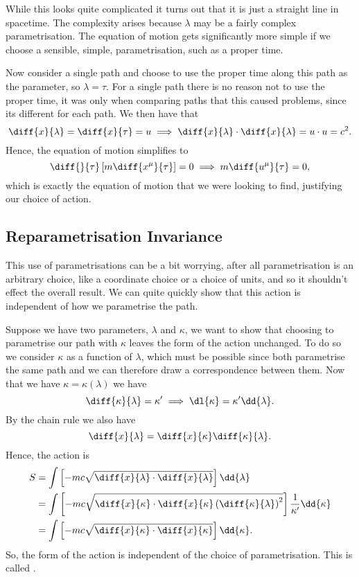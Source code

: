 While this looks quite complicated it turns out that it is just a straight line in spacetime.
The complexity arises because \(\lambda\) may be a fairly complex parametrisation.
The equation of motion gets significantly more simple if we choose a sensible, simple, parametrisation, such as a proper time.

Now consider a single path and choose to use the proper time along this path as the parameter, so \(\lambda = \tau\).
For a single path there is no reason not to use the proper time, it was only when comparing paths that this caused problems, since its different for each path.
We then have that
\begin{equation}
    \diff{x}{\lambda} = \diff{x}{\tau} = u \implies \diff{x}{\lambda}\cdot\diff{x}{\lambda} = u \cdot u = c^2.
\end{equation}
Hence, the equation of motion simplifies to
\begin{equation}
    \diff{}{\tau}\left[ m\diff{x^\mu}{\tau} \right] = 0 \implies m\diff{u^\mu}{\tau} = 0,
\end{equation}
which is exactly the equation of motion that we were looking to find, justifying our choice of action.

\subsection{Reparametrisation Invariance}
This use of parametrisations can be a bit worrying, after all parametrisation is an arbitrary choice, like a coordinate choice or a choice of units, and so it shouldn't effect the overall result.
We can quite quickly show that this action is independent of how we parametrise the path.

Suppose we have two parameters, \(\lambda\) and \(\kappa\), we want to show that choosing to parametrise our path with \(\kappa\) leaves the form of the action unchanged.
To do so we consider \(\kappa\) as a function of \(\lambda\), which must be possible since both parametrise the same path and we can therefore draw a correspondence between them.
Now that we have \(\kappa = \kappa(\lambda)\) we have
\begin{equation}
    \diff{\kappa}{\lambda} = \kappa' \implies \dl{\kappa} = \kappa'\dd{\lambda}.
\end{equation}
By the chain rule we also have
\begin{equation}
    \diff{x}{\lambda} = \diff{x}{\kappa}\diff{\kappa}{\lambda}.
\end{equation}
Hence, the action is
\begin{align}
    S &= \int \left[ -mc \sqrt{\diff{x}{\lambda} \cdot \diff{x}{\lambda}} \right] \dd{\lambda}\\
    &= \int \left[ -mc \sqrt{\diff{x}{\kappa} \cdot \diff{x}{\kappa} \left( \diff{\kappa}{\lambda} \right)^2} \right] \frac{1}{\kappa'} \dd{\kappa}\\
    &= \int \left[ -mc \sqrt{\diff{x}{\kappa} \cdot \diff{x}{\kappa}} \right] \dd{\kappa}.
\end{align}
So, the form of the action is independent of the choice of parametrisation.
This is called .

